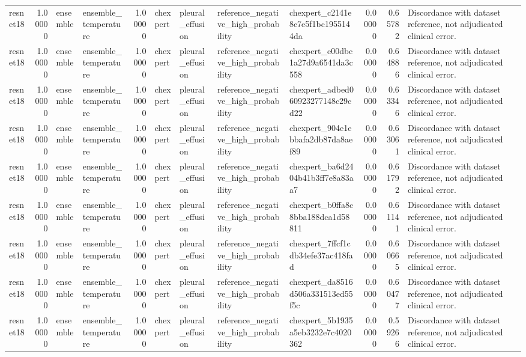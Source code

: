 \begin{tabular}{lrllrllllrrl}
resnet18 & 1.00000 & ensemble & ensemble\_temperature & 1.00000 & chexpert & pleural\_effusion & reference\_negative\_high\_probability & chexpert\_c2141e8c7e5f1bc1955144da & 0.00000 & 0.65782 & Discordance with dataset reference, not adjudicated clinical error. \\
resnet18 & 1.00000 & ensemble & ensemble\_temperature & 1.00000 & chexpert & pleural\_effusion & reference\_negative\_high\_probability & chexpert\_e00dbc1a27d9a6541da3c558 & 0.00000 & 0.64886 & Discordance with dataset reference, not adjudicated clinical error. \\
resnet18 & 1.00000 & ensemble & ensemble\_temperature & 1.00000 & chexpert & pleural\_effusion & reference\_negative\_high\_probability & chexpert\_adbed060923277148c29cd22 & 0.00000 & 0.63346 & Discordance with dataset reference, not adjudicated clinical error. \\
resnet18 & 1.00000 & ensemble & ensemble\_temperature & 1.00000 & chexpert & pleural\_effusion & reference\_negative\_high\_probability & chexpert\_904e1ebbafa2db87da8aef89 & 0.00000 & 0.63061 & Discordance with dataset reference, not adjudicated clinical error. \\
resnet18 & 1.00000 & ensemble & ensemble\_temperature & 1.00000 & chexpert & pleural\_effusion & reference\_negative\_high\_probability & chexpert\_ba6d2404b41b3ff7e8a83aa7 & 0.00000 & 0.61792 & Discordance with dataset reference, not adjudicated clinical error. \\
resnet18 & 1.00000 & ensemble & ensemble\_temperature & 1.00000 & chexpert & pleural\_effusion & reference\_negative\_high\_probability & chexpert\_b0ffa8c8bba188dca1d58811 & 0.00000 & 0.61141 & Discordance with dataset reference, not adjudicated clinical error. \\
resnet18 & 1.00000 & ensemble & ensemble\_temperature & 1.00000 & chexpert & pleural\_effusion & reference\_negative\_high\_probability & chexpert\_7ffcf1cdb34efe37ac418fad & 0.00000 & 0.60665 & Discordance with dataset reference, not adjudicated clinical error. \\
resnet18 & 1.00000 & ensemble & ensemble\_temperature & 1.00000 & chexpert & pleural\_effusion & reference\_negative\_high\_probability & chexpert\_da8516d506a331513ed55f5c & 0.00000 & 0.60477 & Discordance with dataset reference, not adjudicated clinical error. \\
resnet18 & 1.00000 & ensemble & ensemble\_temperature & 1.00000 & chexpert & pleural\_effusion & reference\_negative\_high\_probability & chexpert\_5b1935a5eb3232e7c4020362 & 0.00000 & 0.59266 & Discordance with dataset reference, not adjudicated clinical error. \\

\end{tabular}
